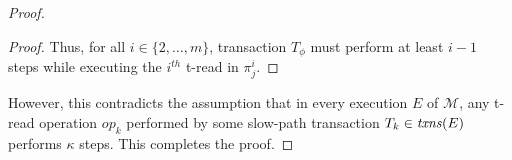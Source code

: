 \begin{proof}
\begin{proof}
Thus, for all $i \in \{2,\ldots, m\}$, transaction $T_{\phi}$ must perform at least $i-1$ steps 
while executing the $i^{th}$ t-read in $\pi_{j}^i$.
\end{proof}
%
However, this contradicts the assumption that in every execution $E$ of $\mathcal{M}$, any t-read operation $op_k$ performed by some slow-path transaction $T_k \in \ms{txns}(E)$
performs $\kappa$ steps. This completes the proof.
\end{proof}

